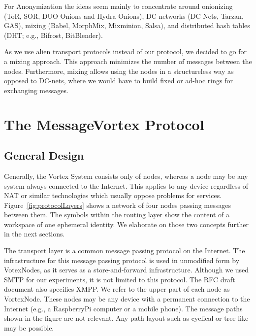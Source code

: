 \documentclass[10pt,journal,compsoc,twocolumn,twoside]{IEEEtran}
\begin{document}
For Anonymization the ideas seem mainly to concentrate around onionizing (ToR\cite{tor-spec}, SOR\cite{Egners_2012}, DUO-Onions and Hydra-Onions\cite{iwanik2005duo}), DC networks (DC-Nets\cite{chaum-dc}, Tarzan\cite{tarzan:ccs02}, GAS\cite{AthanRAM07}), mixing (Babel\cite{babel}, MorphMix\cite{morphmix:wpes2002}, Mixminion\cite{minion-design}, Salsa\cite{Salsa}), and distributed hash tables (DHT; e.g., Bifrost\cite{Kondo2009}, BitBlender\cite{Bauer_2008}).

As we use alien transport protocols instead of our protocol, we decided to go for a mixing approach. This approach minimizes the number of messages between the nodes. Furthermore, mixing allows using the nodes in a structureless way as opposed to DC-nets, where we would have to build fixed or ad-hoc rings for exchanging messages. %

\section{The MessageVortex Protocol\label{sec:protocol}}

\subsection{General Design}

Generally, the Vortex System consists only of nodes, whereas a node may be any system always connected to the Internet. This applies to any device regardless of NAT or similar technologies which usually oppose problems for services. Figure~\ref{fig:protocolLayers} shows a network of four nodes passing messages between them. The symbols within the routing layer show the content of a workspace of one ephemeral identity. We elaborate on those two concepts further in the next sections. 

The transport layer is a common message passing protocol on the Internet. The infrastructure for this message passing protocol is used in unmodified form by VotexNodes, as it serves as a store-and-forward infrastructure. Although we used SMTP for our experiments, it is not limited to this protocol. The RFC draft document also specifies XMPP. We refer to the upper part of each node as VortexNode. These nodes may be any device with a permanent connection to the Internet (e.g., a RaspberryPi computer or a mobile phone). The message paths shown in the figure are not relevant. Any path layout such as cyclical or tree-like may be possible.
\end{document}
